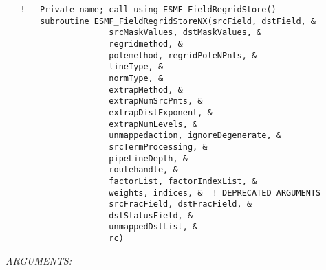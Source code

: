    \label{api:esmf_fieldregridstorenx}
\begin{verbatim}   !   Private name; call using ESMF_FieldRegridStore()
       subroutine ESMF_FieldRegridStoreNX(srcField, dstField, &
                     srcMaskValues, dstMaskValues, &
                     regridmethod, &
                     polemethod, regridPoleNPnts, & 
                     lineType, &
                     normType, &
                     extrapMethod, &
                     extrapNumSrcPnts, &
                     extrapDistExponent, &
                     extrapNumLevels, &
                     unmappedaction, ignoreDegenerate, &
                     srcTermProcessing, & 
                     pipeLineDepth, &
                     routehandle, &
                     factorList, factorIndexList, & 
                     weights, indices, &  ! DEPRECATED ARGUMENTS
                     srcFracField, dstFracField, &
                     dstStatusField, &
                     unmappedDstList, &
                     rc)
        \end{verbatim}{\em ARGUMENTS:}
